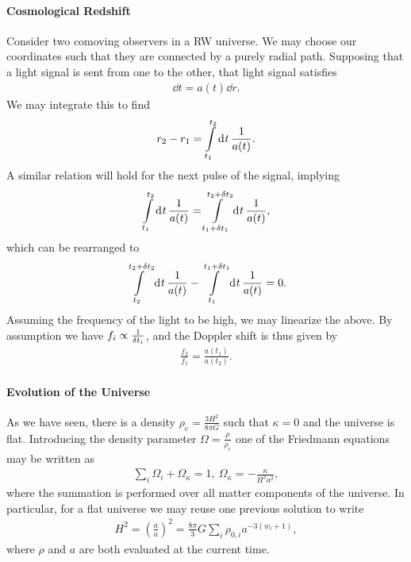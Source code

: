 \paragraph{Cosmological Redshift}
Consider two comoving observers in a RW universe. We may choose our coordinates such that they are connected by a purely radial path. Supposing that a light signal is sent from one to the other, that light signal satisfies
\begin{align*}
	\dd{t} = a(t)\dd{r}.
\end{align*}
We may integrate this to find
\begin{align*}
	r_{2} - r_{1} = \int\limits_{t_{1}}^{t_{2}}\dd[]{t}\frac{1}{a(t)}.
\end{align*}
A similar relation will hold for the next pulse of the signal, implying
\begin{align*}
	\int\limits_{t_{1}}^{t_{2}}\dd[]{t}\frac{1}{a(t)} = \int\limits_{t_{1} + \var{t_{1}}}^{t_{2} + \var{t_{2}}}\dd[]{t}\frac{1}{a(t)},
\end{align*}
which can be rearranged to
\begin{align*}
	\int\limits_{t_{2}}^{t_{2} + \var{t_{2}}}\dd[]{t}\frac{1}{a(t)} - \int\limits_{t_{1}}^{t_{1} + \var{t_{1}}}\dd[]{t}\frac{1}{a(t)} = 0.
\end{align*}
Assuming the frequency of the light to be high, we may linearize the above. By assumption we have $f_{i} \propto \frac{1}{\var{t_{i}}}$, and the Doppler shift is thus given by
\begin{align*}
	\frac{f_{2}}{f_{1}} = \frac{a(t_{1})}{a(t_{2})}.
\end{align*}

\paragraph{Evolution of the Universe}
As we have seen, there is a density $\rho_{\text{c}} = \frac{3H^{2}}{8\pi G}$ such that $\kappa = 0$ and the universe is flat. Introducing the density parameter $\Omega = \frac{\rho}{\rho_{\text{c}}}$ one of the Friedmann equations may be written as
\begin{align*}
	\sum\limits_{i}\Omega_{i} + \Omega_{\kappa} = 1,\ \Omega_{\kappa} = -\frac{\kappa}{H^{2}a^{2}},
\end{align*}
where the summation is performed over all matter components of the universe. In particular, for a flat universe we may reuse one previous solution to write
\begin{align*}
	H^{2} = \left(\frac{\dot{a}}{a}\right)^{2} = \frac{8\pi}{3}G\sum\limits_{i}\rho_{0, i}a^{-3(w_{i} + 1)},
\end{align*}
where $\rho$ and $a$ are both evaluated at the current time.

